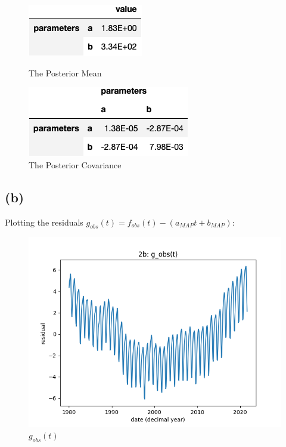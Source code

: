 \documentclass[12pt]{article}
\begin{document}
\begin{figure}[h]
\centering
\begin{minipage}{.5\textwidth}
  \centering
\includegraphics[scale = 0.5]{outputs/q2/a-mean}
\caption{The Posterior Mean}
\label{fig:fig2-a-mean}
\end{minipage}%
\begin{minipage}{.5\textwidth}
  \centering
\includegraphics[scale = 0.5]{outputs/q2/a-covariance}
\caption{The Posterior Covariance}
\label{fig:fig2-a-covariance}
\end{minipage}
\end{figure}

\subsection*{(b)}

Plotting the residuals $g_{obs}(t) = f_{obs}(t) - (a_{MAP}t + b_{MAP})$:

\begin{figure}[h]
\centering
\includegraphics[scale=0.5]{outputs/q2/b-residuals-timeseries}
\caption{$g_{obs}(t)$}
\label{fig:b-residuals-timeseries}
\end{figure}
\end{document}
